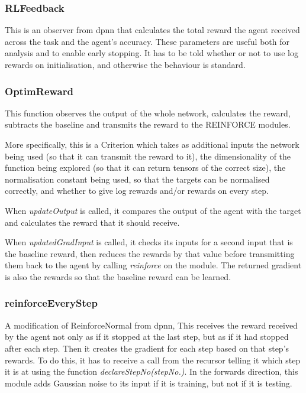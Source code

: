 \subsubsection{RLFeedback}
This is an observer from dpnn that calculates the total reward the agent received across the task and the agent's accuracy. These parameters are useful both for analysis and to enable early stopping. It has to be told whether or not to use log rewards on initialisation, and otherwise the behaviour is standard.

\subsubsection{OptimReward}%
This function observes the output of the whole network, calculates the reward, subtracts the baseline and transmits the reward to the REINFORCE modules.

More specifically, this is a Criterion which takes as additional inputs the network being used (so that it can transmit the reward to it), the dimensionality of the function being explored (so that it can return tensors of the correct size), the normalisation constant being used, so that the targets can be normalised correctly, and whether to give log rewards and/or rewards on every step.

When \emph{updateOutput} is called,  it compares the output of the agent with the target and calculates the reward that it should receive.

When \emph{updatedGradInput} is called, it checks its inputs for a second input that is the baseline reward, then reduces the rewards by that value before transmitting them back to the agent by calling \emph{reinforce} on the module. The returned gradient is also the rewards so that the baseline reward can be learned.

\subsubsection{reinforceEveryStep}
A modification of ReinforceNormal from dpnn, This receives the reward received by the agent not only as if it stopped at the last step, but as if it had stopped after each step. Then it creates the gradient for each step based on that step's rewards. To do this, it has to receive a call from the recursor telling it which step it is at using the function \emph{declareStepNo(stepNo.)}. In the forwards direction, this module adds Gaussian noise to its input if it is training, but not if it is testing.

